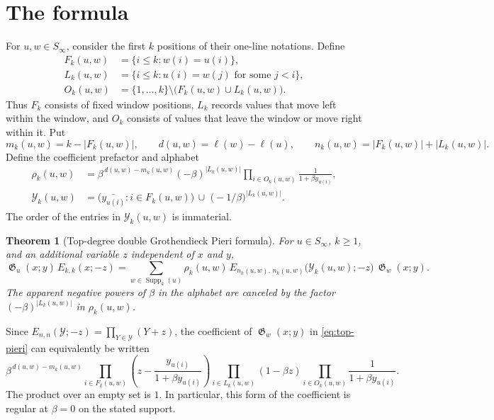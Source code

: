 \documentclass{amsart}
\newtheorem{theorem}{Theorem}
\theoremstyle{definition}
\theoremstyle{remark}
\DeclareMathOperator{\groth}{\mathfrak{G}}
\DeclareMathOperator{\Supp}{Supp}
\begin{document}
\section{The formula}

For $u,w\in S_\infty$, consider the first $k$ positions of their one-line
notations. Define
\begin{align*}
F_k(u,w)&=\{i\le k:w(i)=u(i)\},\\
L_k(u,w)&=\{i\le k:u(i)=w(j)\text{ for some }j<i\},\\
O_k(u,w)&=\{1,\ldots,k\}\setminus\bigl(F_k(u,w)\cup L_k(u,w)\bigr).
\end{align*}
Thus $F_k$ consists of fixed window positions, $L_k$ records values that move
left within the window, and $O_k$ consists of values that leave the window or
move right within it. Put
\[
m_k(u,w)=k-|F_k(u,w)|,\qquad d(u,w)=\ell(w)-\ell(u),
\qquad n_k(u,w)=|F_k(u,w)|+|L_k(u,w)|.
\]
Define the coefficient prefactor and alphabet
\begin{align*}
\rho_k(u,w)
&=\beta^{\,d(u,w)-m_k(u,w)}(-\beta)^{|L_k(u,w)|}
  \prod_{i\in O_k(u,w)}\frac{1}{1+\beta y_{u(i)}},\\
\mathcal{Y}_k(u,w)
&=\bigl(\overline{y_{u(i)}}:i\in F_k(u,w)\bigr)
  \,\cup\,\,
  \bigl(-1/\beta\bigr)^{|L_k(u,w)|}.
\end{align*}
The order of the entries in $\mathcal{Y}_k(u,w)$ is immaterial.

\begin{theorem}[Top-degree double Grothendieck Pieri formula]
\label{thm:top-pieri}
For $u\in S_\infty$, $k\ge1$, and an additional variable $z$ independent of
$x$ and $y$,
\begin{equation}\label{eq:top-pieri}
\groth_u(x;y)\,E_{k,k}(x;-z)
=\sum_{w\in\Supp_k(u)}
\rho_k(u,w)\,
E_{n_k(u,w),\,n_k(u,w)}\bigl(\mathcal{Y}_k(u,w);-z\bigr)\,
\groth_w(x;y).
\end{equation}
The apparent negative powers of $\beta$ in the alphabet are canceled by the
factor $(-\beta)^{|L_k(u,w)|}$ in $\rho_k(u,w)$.
\end{theorem}

Since $E_{n,n}(\mathcal{Y};-z)=\prod_{Y\in\mathcal{Y}}(Y+z)$, the coefficient
of $\groth_w(x;y)$ in \eqref{eq:top-pieri} can equivalently be written
\begin{equation}\label{eq:top-pieri-coeff}
\beta^{\,d(u,w)-m_k(u,w)}
\prod_{i\in F_k(u,w)}
\left(z-\frac{y_{u(i)}}{1+\beta y_{u(i)}}\right)
\prod_{i\in L_k(u,w)}(1-\beta z)
\prod_{i\in O_k(u,w)}\frac{1}{1+\beta y_{u(i)}}.
\end{equation}
The product over an empty set is $1$. In particular, this form of the
coefficient is regular at $\beta=0$ on the stated support.
\end{document}
